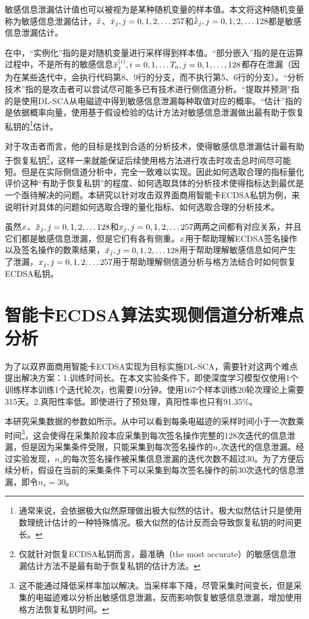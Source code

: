 {	敏感信息泄漏估计值也可以被视为是某种随机变量的样本值。本文将这种随机变量称为敏感信息泄漏估计，$\hat{x}$、$\hat{x}_j,j=0,1,2,\dots257$和$\hat{\tilde{x}}_j,j=0,1,2,\dots128$都是敏感信息泄漏估计。
	
	在中，“实例化”指的是对随机变量进行采样得到样本值。“部分嵌入”指的是在运算过程中，不是所有的敏感信息$\tilde {x}^{(i)}_j,i=0,1,\dots T_a,j=0,1,\dots,128$都存在泄漏（因为在某些迭代中，会执行代码第8、9行的分支，而不执行第5、6行的分支）。“分析技术”指的是攻击者可以尝试尽可能多已有技术进行侧信道分析。“提取并预测”指的是使用DL-SCA从电磁迹中得到敏感信息泄漏每种取值对应的概率。“估计”指的是依据概率向量，使用基于假设检验的估计方法对敏感信息泄漏做出最有助于恢复私钥的\footnote{通常来说，会依据极大似然原理做出极大似然的估计。极大似然估计只是使用数理统计估计的一种特殊情况。极大似然的估计反而会导致恢复私钥的时间更长。}估计。
	
	对于攻击者而言，他的目标是找到合适的分析技术，使得敏感信息泄漏估计最有助于恢复私钥\footnote{仅就针对恢复ECDSA私钥而言，最准确（the most accurate）的敏感信息泄漏估计方法不是最有助于恢复私钥的估计方法。}，这样一来就能保证后续使用格方法进行攻击时攻击总时间尽可能短。但是在实际侧信道分析中，完全一致难以实现。因此如何选取合理的指标量化评价这种“有助于恢复私钥”的程度、如何选取具体的分析技术使得指标达到最优是一个亟待解决的问题。本研究以针对攻击双界面商用智能卡ECDSA私钥为例，来说明针对具体的问题如何选取合理的量化指标、如何选取合理的分析技术。
	
	虽然$x$、$\tilde{x}_j,j=0,1,2,\dots128$和$x_j,j=0,1,2,\dots257$两两之间都有对应关系，并且它们都是敏感信息泄漏，但是它们有各有侧重。$x$用于帮助理解ECDSA签名操作以及签名操作的数乘结果，$\tilde{x}_j,j=0,1,2,\dots128$用于帮助理解敏感信息如何产生了泄漏，$x_j,j=0,1,2,\dots257$用于帮助理解侧信道分析与格方法结合时如何恢复ECDSA私钥。
	
	\section{智能卡ECDSA算法实现侧信道分析难点分析}\label{sec:hardpoint}
	为了以双界面商用智能卡ECDSA实现为目标实施DL-SCA，需要针对这两个难点提出解决方案：1.训练时间长。在本文实验条件下，即使深度学习模型仅使用1个训练样本训练1个迭代轮次，也需要10分钟。使用167个样本训练20轮次理论上需要315天。2.真阳性率低。即使进行了预处理，真阳性率也只有91.35\%。
	
	本研究采集数据的参数如所示。从中可以看到每条电磁迹的采样时间小于一次数乘时间\footnote{这不能通过降低采样率加以解决。当采样率下降，尽管采集时间变长，但是采集的电磁迹难以分析出敏感信息泄漏，反而影响恢复敏感信息泄漏，增加使用格方法恢复私钥时间。}，这会使得在采集阶段本应采集到每次签名操作完整的128次迭代的信息泄漏，但是因为采集条件受限，只能采集到每次签名操作的$n_s$次迭代的信息泄漏。经过实验发现，$n_s$的每次签名操作被采集信息泄漏的迭代次数不超过30。为了方便后续分析，假设在当前的采集条件下可以采集到每次签名操作的前30次迭代的信息泄漏，即令$n_s=30$。
	
}
